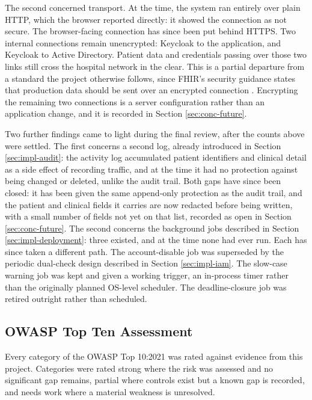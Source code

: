 The second concerned transport. At the time, the system ran entirely over plain HTTP, which the browser reported directly: it showed the connection as not secure. The browser-facing connection has since been put behind HTTPS. Two internal connections remain unencrypted: Keycloak to the application, and Keycloak to Active Directory. Patient data and credentials passing over those two links still cross the hospital network in the clear. This is a partial departure from a standard the project otherwise follows, since FHIR's security guidance states that production data should be sent over an encrypted connection \cite{hl7fhir}. Encrypting the remaining two connections is a server configuration rather than an application change, and it is recorded in Section \ref{sec:conc-future}.

Two further findings came to light during the final review, after the counts above were settled. The first concerns a second log, already introduced in Section \ref{sec:impl-audit}: the activity log accumulated patient identifiers and clinical detail as a side effect of recording traffic, and at the time it had no protection against being changed or deleted, unlike the audit trail. Both gaps have since been closed: it has been given the same append-only protection as the audit trail, and the patient and clinical fields it carries are now redacted before being written, with a small number of fields not yet on that list, recorded as open in Section \ref{sec:conc-future}. The second concerns the background jobs described in Section \ref{sec:impl-deployment}: three existed, and at the time none had ever run. Each has since taken a different path. The account-disable job was superseded by the periodic dual-check design described in Section \ref{sec:impl-iam}. The slow-case warning job was kept and given a working trigger, an in-process timer rather than the originally planned OS-level scheduler. The deadline-closure job was retired outright rather than scheduled.

\subsection{OWASP Top Ten Assessment}

Every category of the OWASP Top 10:2021 was rated against evidence from this project. Categories were rated strong where the risk was assessed and no significant gap remains, partial where controls exist but a known gap is recorded, and needs work where a material weakness is unresolved.

